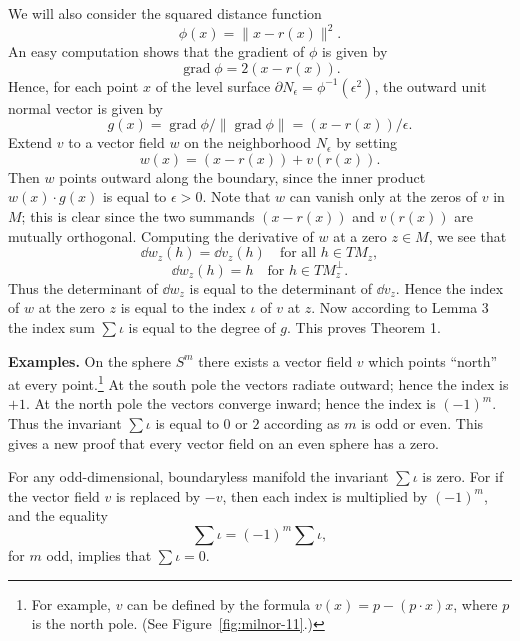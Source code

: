 We will also consider the squared distance function
\[
\phi(x) = \|x - r(x)\|^2.
\]
An easy computation shows that the gradient of $\phi$ is given by
\[
\operatorname{grad} \phi = 2(x - r(x)).
\]
Hence, for each point $x$ of the level surface $\partial N_\epsilon = \phi^{-1}(\epsilon^2)$, the outward unit normal vector is given by
\[
g(x) = \operatorname{grad} \phi / \|\operatorname{grad} \phi\| = (x - r(x))/\epsilon.
\]
Extend $v$ to a vector field $w$ on the neighborhood $N_\epsilon$ by setting
\[
w(x) = (x - r(x)) + v(r(x)).
\]
Then $w$ points outward along the boundary, since the inner product $w(x) \cdot g(x)$ is equal to $\epsilon > 0$. Note that $w$ can vanish only at the zeros of $v$ in $M$; this is clear since the two summands $(x - r(x))$ and $v(r(x))$ are mutually orthogonal. Computing the derivative of $w$ at a zero $z \in M$, we see that
\[
\dd w_z(h) = \dd v_z(h) \quad \text{for all } h \in TM_z,
\]
\[
\dd w_z(h) = h \quad \text{for } h \in TM_z^{\perp}.
\]
Thus the determinant of $\dd w_z$ is equal to the determinant of $\dd v_z$. Hence the index of $w$ at the zero $z$ is equal to the index $\iota$ of $v$ at $z$. Now according to Lemma 3 the index sum $\sum \iota$ is equal to the degree of $g$. This proves Theorem 1.

\noindent\textbf{Examples.} On the sphere $S^m$ there exists a vector field $v$ which points ``north'' at every point.\footnote{For example, $v$ can be defined by the formula $v(x) = p - (p \cdot x)x$, where $p$ is the north pole. (See Figure~\ref{fig:milnor-11}.)} At the south pole the vectors radiate outward; hence the index is $+1$. At the north pole the vectors converge inward; hence the index is $(-1)^m$. Thus the invariant $\sum \iota$ is equal to $0$ or $2$ according as $m$ is odd or even. This gives a new proof that every vector field on an even sphere has a zero.

For any odd-dimensional, boundaryless manifold the invariant $\sum \iota$ is zero. For if the vector field $v$ is replaced by $-v$, then each index is multiplied by $(-1)^m$, and the equality
\[
\sum \iota = (-1)^m \sum \iota,
\]
for $m$ odd, implies that $\sum \iota = 0$.

